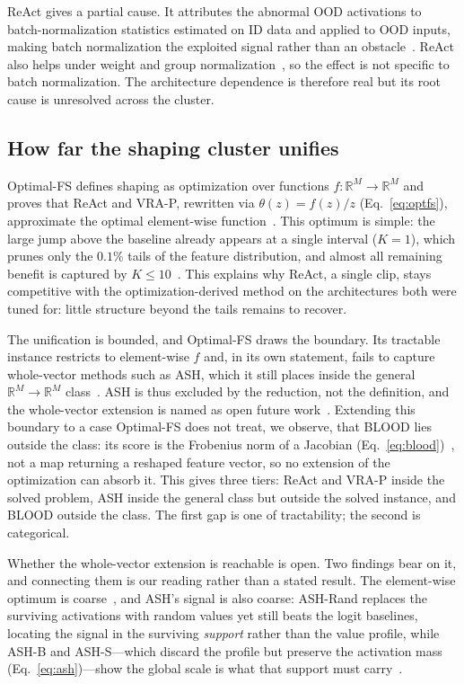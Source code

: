 \documentclass[a4paper]{article}
\begin{document}
ReAct gives a partial cause. It attributes the abnormal OOD activations to
batch-normalization statistics estimated on ID data and applied to OOD inputs, making
batch normalization the exploited signal rather than an obstacle~\citep{react}. ReAct
also helps under weight and group normalization~\citep{react}, so the effect is not
specific to batch normalization. The architecture dependence is therefore real but its
root cause is unresolved across the cluster.

\subsection{How far the shaping cluster unifies}
\label{subsec:disc-unify}

Optimal-FS defines shaping as optimization over functions
$f : \mathbb{R}^{M} \to \mathbb{R}^{M}$ and proves that ReAct and VRA-P, rewritten via
$\theta(z) = f(z)/z$ (Eq.~\ref{eq:optfs}), approximate the optimal element-wise
function~\citep{optimalfs}.
This optimum is simple: the large jump above the baseline already appears at a
single interval ($K=1$), which prunes only the $0.1\%$ tails of the feature
distribution, and almost all remaining benefit is captured by $K \leq
10$~\citep{optimalfs}. This explains why ReAct, a single clip, stays competitive
with the optimization-derived method on the architectures both were tuned for:
little structure beyond the tails remains to recover.

The unification is bounded, and Optimal-FS draws the boundary. Its tractable instance
restricts to element-wise $f$ and, in its own statement, fails to capture whole-vector
methods such as ASH, which it still places inside the general
$\mathbb{R}^{M} \to \mathbb{R}^{M}$ class~\citep{optimalfs}. ASH is thus excluded by the
reduction, not the definition, and the whole-vector extension is named as open future
work~\citep{optimalfs}. Extending this boundary to a case Optimal-FS does not treat, we
observe, that BLOOD lies outside the class: its score is the Frobenius norm of a
Jacobian (Eq.~\ref{eq:blood})~\citep{blood}, not a map returning a reshaped feature
vector, so no extension of the optimization can absorb it. This gives three tiers: ReAct and VRA-P inside the solved
problem, ASH inside the general class but outside the solved instance, and BLOOD outside
the class. The first gap is one of tractability; the second is categorical.

Whether the whole-vector extension is reachable is open. Two findings bear on it, and
connecting them is our reading rather than a stated result. The element-wise optimum is coarse~\citep{optimalfs}, and ASH's signal is also
coarse: ASH-Rand replaces the surviving activations with random values yet still
beats the logit baselines, locating the signal in the surviving \emph{support}
rather than the value profile, while ASH-B and ASH-S---which discard the profile
but preserve the activation mass (Eq.~\ref{eq:ash})---show the global scale is what that support
must carry~\citep{ash}.
\end{document}
